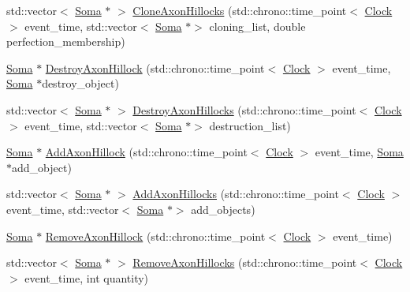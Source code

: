 \begin{DoxyCompactItemize}
\item 
std\+::vector$<$ \mbox{\hyperlink{class_soma}{Soma}} $\ast$ $>$ \mbox{\hyperlink{class_soma_a299c95b89f50576244d1e56f531a80be}{Clone\+Axon\+Hillocks}} (std\+::chrono\+::time\+\_\+point$<$ \mbox{\hyperlink{universe_8h_a0ef8d951d1ca5ab3cfaf7ab4c7a6fd80}{Clock}} $>$ event\+\_\+time, std\+::vector$<$ \mbox{\hyperlink{class_soma}{Soma}} $\ast$$>$ cloning\+\_\+list, double perfection\+\_\+membership)
\item 
\mbox{\hyperlink{class_soma}{Soma}} $\ast$ \mbox{\hyperlink{class_soma_af6d6d3e3c94f06682cf05a7a72032a46}{Destroy\+Axon\+Hillock}} (std\+::chrono\+::time\+\_\+point$<$ \mbox{\hyperlink{universe_8h_a0ef8d951d1ca5ab3cfaf7ab4c7a6fd80}{Clock}} $>$ event\+\_\+time, \mbox{\hyperlink{class_soma}{Soma}} $\ast$destroy\+\_\+object)
\item 
std\+::vector$<$ \mbox{\hyperlink{class_soma}{Soma}} $\ast$ $>$ \mbox{\hyperlink{class_soma_a5220929442601962af1a1fad66a8c919}{Destroy\+Axon\+Hillocks}} (std\+::chrono\+::time\+\_\+point$<$ \mbox{\hyperlink{universe_8h_a0ef8d951d1ca5ab3cfaf7ab4c7a6fd80}{Clock}} $>$ event\+\_\+time, std\+::vector$<$ \mbox{\hyperlink{class_soma}{Soma}} $\ast$$>$ destruction\+\_\+list)
\item 
\mbox{\hyperlink{class_soma}{Soma}} $\ast$ \mbox{\hyperlink{class_soma_a02e0e4656099531b35ab56ad1f7c945a}{Add\+Axon\+Hillock}} (std\+::chrono\+::time\+\_\+point$<$ \mbox{\hyperlink{universe_8h_a0ef8d951d1ca5ab3cfaf7ab4c7a6fd80}{Clock}} $>$ event\+\_\+time, \mbox{\hyperlink{class_soma}{Soma}} $\ast$add\+\_\+object)
\item 
std\+::vector$<$ \mbox{\hyperlink{class_soma}{Soma}} $\ast$ $>$ \mbox{\hyperlink{class_soma_a0fbede6e06b8e24a2cf22878c2f49165}{Add\+Axon\+Hillocks}} (std\+::chrono\+::time\+\_\+point$<$ \mbox{\hyperlink{universe_8h_a0ef8d951d1ca5ab3cfaf7ab4c7a6fd80}{Clock}} $>$ event\+\_\+time, std\+::vector$<$ \mbox{\hyperlink{class_soma}{Soma}} $\ast$$>$ add\+\_\+objects)
\item 
\mbox{\hyperlink{class_soma}{Soma}} $\ast$ \mbox{\hyperlink{class_soma_a2f75c0f716fa1f74f70697db9dfcd562}{Remove\+Axon\+Hillock}} (std\+::chrono\+::time\+\_\+point$<$ \mbox{\hyperlink{universe_8h_a0ef8d951d1ca5ab3cfaf7ab4c7a6fd80}{Clock}} $>$ event\+\_\+time)
\item 
std\+::vector$<$ \mbox{\hyperlink{class_soma}{Soma}} $\ast$ $>$ \mbox{\hyperlink{class_soma_a7281585d74015a2549a19df6cb16e3fb}{Remove\+Axon\+Hillocks}} (std\+::chrono\+::time\+\_\+point$<$ \mbox{\hyperlink{universe_8h_a0ef8d951d1ca5ab3cfaf7ab4c7a6fd80}{Clock}} $>$ event\+\_\+time, int quantity)
$$
\end{DoxyCompactItemize}
